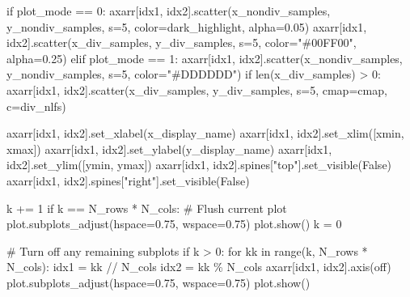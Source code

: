 \documentclass[
  letterpaper,
  DIV=11,
  numbers=noendperiod]{scrartcl}
\newenvironment{Shaded}{\begin{snugshade}}{\end{snugshade}}
\newcommand{\BuiltInTok}[1]{\textcolor[rgb]{0.00,0.23,0.31}{#1}}
\newcommand{\CommentTok}[1]{\textcolor[rgb]{0.37,0.37,0.37}{#1}}
\newcommand{\ControlFlowTok}[1]{\textcolor[rgb]{0.00,0.23,0.31}{#1}}
\newcommand{\DecValTok}[1]{\textcolor[rgb]{0.68,0.00,0.00}{#1}}
\newcommand{\FloatTok}[1]{\textcolor[rgb]{0.68,0.00,0.00}{#1}}
\newcommand{\KeywordTok}[1]{\textcolor[rgb]{0.00,0.23,0.31}{#1}}
\newcommand{\NormalTok}[1]{\textcolor[rgb]{0.00,0.23,0.31}{#1}}
\newcommand{\OperatorTok}[1]{\textcolor[rgb]{0.37,0.37,0.37}{#1}}
\newcommand{\StringTok}[1]{\textcolor[rgb]{0.13,0.47,0.30}{#1}}
\newcommand{\VariableTok}[1]{\textcolor[rgb]{0.07,0.07,0.07}{#1}}
\begin{document}
\begin{Shaded}
\begin{Highlighting}[]
      \ControlFlowTok{if}\NormalTok{ plot\_mode }\OperatorTok{==} \DecValTok{0}\NormalTok{:}
\NormalTok{        axarr[idx1, idx2].scatter(x\_nondiv\_samples, y\_nondiv\_samples, s}\OperatorTok{=}\DecValTok{5}\NormalTok{,}
\NormalTok{                                  color}\OperatorTok{=}\NormalTok{dark\_highlight, alpha}\OperatorTok{=}\FloatTok{0.05}\NormalTok{)}
\NormalTok{        axarr[idx1, idx2].scatter(x\_div\_samples, y\_div\_samples, s}\OperatorTok{=}\DecValTok{5}\NormalTok{,}
\NormalTok{                                  color}\OperatorTok{=}\StringTok{"\#00FF00"}\NormalTok{, alpha}\OperatorTok{=}\FloatTok{0.25}\NormalTok{)}
      \ControlFlowTok{elif}\NormalTok{ plot\_mode }\OperatorTok{==} \DecValTok{1}\NormalTok{:}
\NormalTok{        axarr[idx1, idx2].scatter(x\_nondiv\_samples, y\_nondiv\_samples, }
\NormalTok{                                s}\OperatorTok{=}\DecValTok{5}\NormalTok{, color}\OperatorTok{=}\StringTok{"\#DDDDDD"}\NormalTok{)}
        \ControlFlowTok{if} \BuiltInTok{len}\NormalTok{(x\_div\_samples) }\OperatorTok{\textgreater{}} \DecValTok{0}\NormalTok{:}
\NormalTok{          axarr[idx1, idx2].scatter(x\_div\_samples, y\_div\_samples, s}\OperatorTok{=}\DecValTok{5}\NormalTok{,}
\NormalTok{                                    cmap}\OperatorTok{=}\NormalTok{cmap, c}\OperatorTok{=}\NormalTok{div\_nlfs)}
                                
\NormalTok{      axarr[idx1, idx2].set\_xlabel(x\_display\_name)}
\NormalTok{      axarr[idx1, idx2].set\_xlim([xmin, xmax])}
\NormalTok{      axarr[idx1, idx2].set\_ylabel(y\_display\_name)}
\NormalTok{      axarr[idx1, idx2].set\_ylim([ymin, ymax])}
\NormalTok{      axarr[idx1, idx2].spines[}\StringTok{"top"}\NormalTok{].set\_visible(}\VariableTok{False}\NormalTok{)}
\NormalTok{      axarr[idx1, idx2].spines[}\StringTok{"right"}\NormalTok{].set\_visible(}\VariableTok{False}\NormalTok{)}
      
\NormalTok{      k }\OperatorTok{+=} \DecValTok{1}
      \ControlFlowTok{if}\NormalTok{ k }\OperatorTok{==}\NormalTok{ N\_rows }\OperatorTok{*}\NormalTok{ N\_cols:}
        \CommentTok{\# Flush current plot}
\NormalTok{        plot.subplots\_adjust(hspace}\OperatorTok{=}\FloatTok{0.75}\NormalTok{, wspace}\OperatorTok{=}\FloatTok{0.75}\NormalTok{)}
\NormalTok{        plot.show()}
\NormalTok{        k }\OperatorTok{=} \DecValTok{0}
  
  \CommentTok{\# Turn off any remaining subplots }
  \ControlFlowTok{if}\NormalTok{ k }\OperatorTok{\textgreater{}} \DecValTok{0}\NormalTok{: }
    \ControlFlowTok{for}\NormalTok{ kk }\KeywordTok{in} \BuiltInTok{range}\NormalTok{(k, N\_rows }\OperatorTok{*}\NormalTok{ N\_cols):}
\NormalTok{      idx1 }\OperatorTok{=}\NormalTok{ kk }\OperatorTok{//}\NormalTok{ N\_cols}
\NormalTok{      idx2 }\OperatorTok{=}\NormalTok{ kk }\OperatorTok{\%}\NormalTok{ N\_cols}
\NormalTok{      axarr[idx1, idx2].axis(}\StringTok{\textquotesingle{}off\textquotesingle{}}\NormalTok{)}
\NormalTok{    plot.subplots\_adjust(hspace}\OperatorTok{=}\FloatTok{0.75}\NormalTok{, wspace}\OperatorTok{=}\FloatTok{0.75}\NormalTok{)}
\NormalTok{    plot.show()}
\end{Highlighting}
\end{Shaded}
\end{document}
